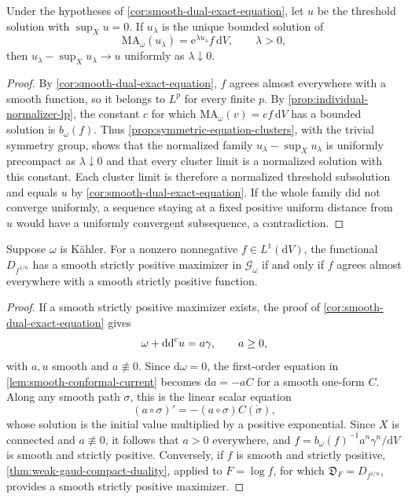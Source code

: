 \begin{corollary}\label{cor:smooth-dual-exponential-limit}
Under the hypotheses of \cref{cor:smooth-dual-exact-equation}, let $u$ be the threshold solution with $\sup_Xu=0$. If $u_\lambda$ is the unique bounded solution of
\[
 \mathrm{MA}_\omega(u_\lambda)=\mathrm{e}^{\lambda u_\lambda}f\,\mathrm{d}V,
 \qquad\lambda>0,
\]
then $u_\lambda-\sup_Xu_\lambda\to u$ uniformly as $\lambda\downarrow0$.
\end{corollary}
\begin{proof}
By \cref{cor:smooth-dual-exact-equation}, $f$ agrees almost everywhere with a smooth function, so it belongs to $L^p$ for every finite $p$. By \cref{prop:individual-normalizer-lp}, the constant $c$ for which $\mathrm{MA}_\omega(v)=cf\,\mathrm{d}V$ has a bounded solution is $b_\omega(f)$. Thus \cref{prop:symmetric-equation-clusters}, with the trivial symmetry group, shows that the normalized family $u_\lambda-\sup_Xu_\lambda$ is uniformly precompact as $\lambda\downarrow0$ and that every cluster limit is a normalized solution with this constant. Each cluster limit is therefore a normalized threshold subsolution and equals $u$ by \cref{cor:smooth-dual-exact-equation}. If the whole family did not converge uniformly, a sequence staying at a fixed positive uniform distance from $u$ would have a uniformly convergent subsequence, a contradiction.
\end{proof}

\begin{corollary}\label{cor:kahler-smooth-dual-attainment}
Suppose $\omega$ is K\"ahler. For a nonzero nonnegative $f\in L^1(\mathrm{d}V)$, the functional $D_{f^{1/n}}$ has a smooth strictly positive maximizer in $\mathscr G_\omega$ if and only if $f$ agrees almost everywhere with a smooth strictly positive function.
\end{corollary}
\begin{proof}
If a smooth strictly positive maximizer exists, the proof of \cref{cor:smooth-dual-exact-equation} gives
\[
 \omega+\mathrm{dd}^{\mathrm{c}} u=a\gamma,
 \qquad a\geq0,
\]
with $a,u$ smooth and $a\not\equiv0$. Since $\mathrm{d}\omega=0$, the first-order equation in \cref{lem:smooth-conformal-current} becomes $\mathrm{d}a=-aC$ for a smooth one-form $C$. Along any smooth path $\sigma$, this is the linear scalar equation
\[
 (a\circ\sigma)'=-(a\circ\sigma)C(\dot\sigma),
\]
whose solution is the initial value multiplied by a positive exponential. Since $X$ is connected and $a\not\equiv0$, it follows that $a>0$ everywhere, and $f=b_\omega(f)^{-1}a^n\gamma^n/\mathrm{d}V$ is smooth and strictly positive. Conversely, if $f$ is smooth and strictly positive, \cref{thm:weak-gaud-compact-duality}, applied to $F=\log f$, for which $\mathfrak D_F=D_{f^{1/n}}$, provides a smooth strictly positive maximizer.
\end{proof}

